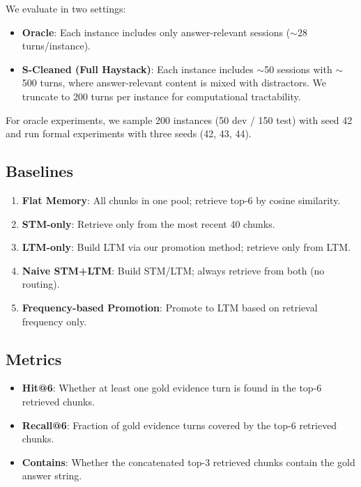 \documentclass{article}
\begin{document}
We evaluate in two settings:
\begin{itemize}
    \item \textbf{Oracle}: Each instance includes only answer-relevant sessions ($\sim$28 turns/instance).
    \item \textbf{S-Cleaned (Full Haystack)}: Each instance includes $\sim$50 sessions with $\sim$500 turns, where answer-relevant content is mixed with distractors. We truncate to 200 turns per instance for computational tractability.
\end{itemize}

For oracle experiments, we sample 200 instances (50 dev / 150 test) with seed 42 and run formal experiments with three seeds (42, 43, 44).

\subsection{Baselines}

\begin{enumerate}
    \item \textbf{Flat Memory}: All chunks in one pool; retrieve top-6 by cosine similarity.
    \item \textbf{STM-only}: Retrieve only from the most recent 40 chunks.
    \item \textbf{LTM-only}: Build LTM via our promotion method; retrieve only from LTM.
    \item \textbf{Naive STM+LTM}: Build STM/LTM; always retrieve from both (no routing).
    \item \textbf{Frequency-based Promotion}: Promote to LTM based on retrieval frequency only.
\end{enumerate}

\subsection{Metrics}

\begin{itemize}
    \item \textbf{Hit@6}: Whether at least one gold evidence turn is found in the top-6 retrieved chunks.
    \item \textbf{Recall@6}: Fraction of gold evidence turns covered by the top-6 retrieved chunks.
    \item \textbf{Contains}: Whether the concatenated top-3 retrieved chunks contain the gold answer string.
\end{itemize}
\end{document}
